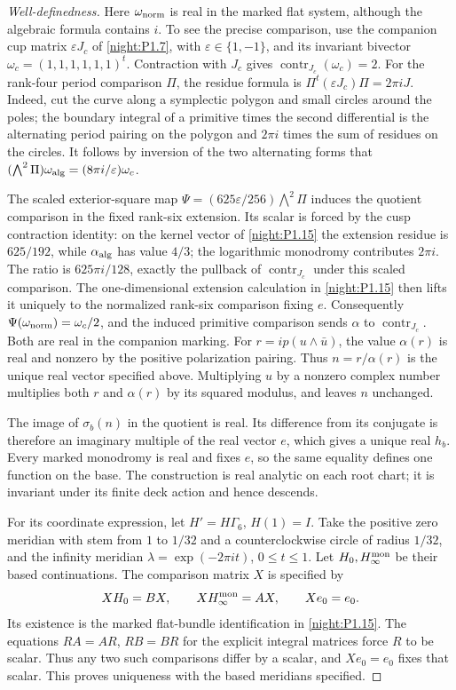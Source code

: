 \begin{proof}[Well-definedness]
Here $\omega_{\rm norm}$ is real in the marked flat system,
although the algebraic formula contains $i$. To see the precise
comparison, use the companion cup matrix $\varepsilon J_c$ of
\cref{night:P1.7}, with $\varepsilon\in\{1,-1\}$, and its
invariant bivector $\omega_c=(1,1,1,1,1,1)^t$.
Contraction with $J_c$ gives $\operatorname{contr}_{J_c}(\omega_c)=2$.
For the rank-four period comparison $\Pi$, the residue formula is
$\Pi^t(\varepsilon J_c)\Pi=2\pi iJ$.
Indeed, cut the curve along a symplectic polygon and small circles
around the poles; the boundary integral of a primitive times the
second differential is the alternating period pairing on the
polygon and $2\pi i$ times the sum of residues on the circles.
It follows by inversion of the two alternating forms that
$(\bigwedge^2\Pi)\omega_{\rm alg}=(8\pi i/\varepsilon)\omega_c$.

The scaled exterior-square map
$\Psi=(625\varepsilon/256)\bigwedge^2\Pi$ induces the
quotient comparison in the fixed rank-six extension. Its scalar is forced by the cusp contraction identity: on the
kernel vector of \cref{night:P1.15} the extension residue is
$625/192$, while $\alpha_{\rm alg}$ has value $4/3$; the
logarithmic monodromy contributes $2\pi i$. The ratio is
$625\pi i/128$, exactly the pullback of
$\operatorname{contr}_{J_c}$ under this scaled comparison.
The one-dimensional extension calculation in
\cref{night:P1.15} then lifts it uniquely to the normalized
rank-six comparison fixing $e$.
Consequently $\Psi(\omega_{\rm norm})=\omega_c/2$, and
the induced primitive comparison sends $\alpha$ to
$\operatorname{contr}_{J_c}$. Both are real in the companion
marking. For $r=ip(u\wedge\bar u)$, the value $\alpha(r)$
is real and nonzero by the positive polarization pairing.
Thus $n=r/\alpha(r)$ is the unique real vector specified above.
Multiplying $u$ by a nonzero complex number multiplies both
$r$ and $\alpha(r)$ by its squared modulus, and leaves $n$
unchanged.

The image of $\sigma_b(n)$ in the quotient is real. Its
difference from its conjugate is therefore an imaginary
multiple of the real vector $e$, which gives a unique real
$h_b$. Every marked monodromy is real and fixes $e$, so the
same equality defines one function on the base. The construction
is real analytic on each root chart; it is invariant under its
finite deck action and hence descends.

For its coordinate expression, let $H'=H\Gamma_6$, $H(1)=I$.
Take the positive zero meridian with stem from $1$ to $1/32$
and a counterclockwise circle of radius $1/32$, and the infinity
meridian $\lambda=\exp(-2\pi it)$, $0\le t\le1$.
Let $H_0,H_\infty^{\rm mon}$ be their based continuations.
The comparison matrix $X$ is specified by
\[
 XH_0=BX,\qquad XH_\infty^{\rm mon}=AX,\qquad Xe_0=e_0.
\]
Its existence is the marked flat-bundle identification in
\cref{night:P1.15}. The equations $RA=AR$, $RB=BR$ for the
explicit integral matrices force $R$ to be scalar. Thus any
two such comparisons differ by a scalar, and $Xe_0=e_0$ fixes
that scalar. This proves uniqueness with the based meridians
specified.


\end{proof}
